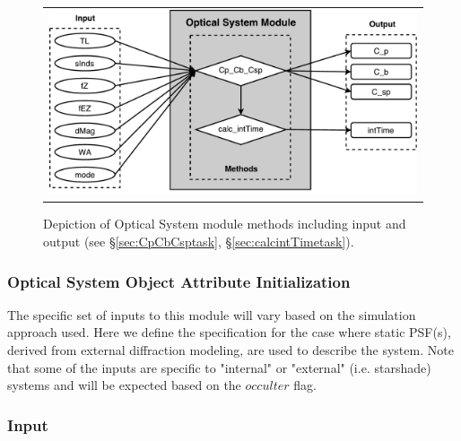\documentclass[cleanfoot]{asme2ej}
\begin{document}
\begin{figure}[ht]
    \begin{center}
        \begin{tabular}{c}
            \includegraphics[width=\textwidth]{OpticalSystem}
        \end{tabular}
    \end{center}
    \caption{\label{fig:opticalsysmodule} Depiction of Optical System module methods including input and output (see \S\ref{sec:CpCbCsptask}, \S\ref{sec:calcintTimetask}).}
\end{figure}

\label{sec:opticalsystem}
\subsubsection{Optical System Object Attribute Initialization} 

The specific set of inputs to this module will vary based on the simulation approach used.  Here we define the specification for the case where static PSF(s), derived from external diffraction modeling, are used to describe the system.  Note that some of the inputs are specific to "internal" or "external" (i.e. starshade) systems and will be expected based on the $occulter$ flag.

\subsubsection*{Input}
\end{document}
